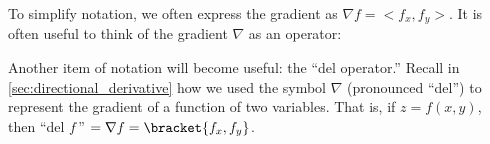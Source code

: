 

\usepackage{headers/apex_style}



\newcommand{\forwhom}{}

\printallanswers
\printincolor
\usethreeDgraphics




%

\mainmatter

\pagestyle{fancy}

To simplify notation, we often express the gradient as $\nabla f =<f_x, f_y>$. It is often useful to think of the gradient $\nabla$ as an operator:

\cleardoublepage

Another item of notation will become useful: the ``del operator.'' Recall in \autoref{sec:directional_derivative} how we used the symbol $\nabla$ (pronounced ``del'') to represent the gradient of a function of two variables. That is, if $z = f(x,y)$, then ``del $f$\,'' $= \nabla f =\bracket{f_x, f_y}$.

\cleardoublepage

%
%
%
%
%

\appendix
\renewcommand{\thepage}{A.\arabic{page}}


\pagestyle{empty}
\eendgeometry

\cleardoublepage
{}
{}
\printindex

%
%



